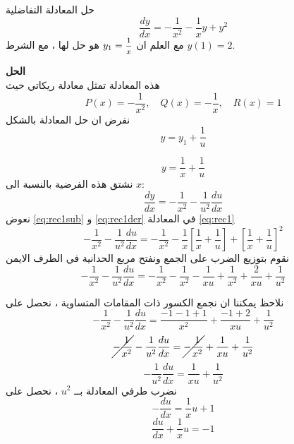 		\begin{frame}
			\setcounter{equation}{0}
			\begin{example}
				حل المعادلة التفاضلية
				\begin{equation}
					\label{eq:rec1}
					\frac{dy}{dx} = -\frac{1}{x^2} - \frac{1}{x} y + y^2
				\end{equation}
				مع العلم ان 
				$y_1=\mfrac{1}{x}$ هو حل لها ، مع الشرط $y(1) = 2 $.
			\end{example}
			\textbf{الحل}\\
				هذه المعادلة تمثل معادلة ريكاتي حيث
				\[
				P(x) = -\frac{1}{x^2}, \quad Q(x) =-\frac{1}{x} , \quad R(x) = 1 
				\]
				نفرض ان حل المعادلة بالشكل
				\[
				y = y_1 + \frac{1}{u}
				\]
			\end{frame}
			
			\begin{frame}
				
				\begin{equation}
					\label{eq:rec1sub}
					y = \frac{1}{x} + \frac{1}{u}
				\end{equation}
				نشتق هذه الفرضية بالنسبة الى $x$:
				\begin{equation}
					\label{eq:rec1der}
					\frac{dy}{dx} = -\frac{1}{x^2} - \frac{1}{u^2}\frac{du}{dx}
				\end{equation}
				نعوض 
				\eqref{eq:rec1sub} و \eqref{eq:rec1der} في المعادلة \eqref{eq:rec1}
				\[
				-\frac{1}{x^2} - \frac{1}{u^2}\frac{du}{dx} = -\frac{1}{x^2} - \frac{1}{x} \left[\frac{1}{x} + \frac{1}{u}\right] + \left[\frac{1}{x} + \frac{1}{u}\right]^2
				\]
				نقوم بتوزيع الضرب على الجمع ونفتح مربع الحدانية في الطرف الايمن
				\[
				-\frac{1}{x^2} - \frac{1}{u^2}\frac{du}{dx}=
				-\frac{1}{x^2}-\frac{1}{x^2} -\frac{1}{xu} + \frac{1}{x^2} + \frac{2}{xu} + \frac{1}{u^2}
				\]
			\end{frame}
			
			\begin{frame}
				
				نلاحظ يمكننا ان نجمع الكسور ذات المقامات المتساوية ، نحصل على 
				\[
				-\frac{1}{x^2} - \frac{1}{u^2}\frac{du}{dx}=
				\frac{-1-1+1}{x^2} + \frac{-1+2}{xu} + \frac{1}{u^2} 
				\]
				\[
				\cancel{-\frac{1}{x^2}} - \frac{1}{u^2}\frac{du}{dx}=
				\cancel{-\frac{1}{x^2}} + \frac{1}{xu} + \frac{1}{u^2}
				\]
				\[
				-\frac{1}{u^2}\frac{du}{dx} = \frac{1}{xu} + \frac{1}{u^2}
				\]
				نضرب طرفي المعادلة بــ  $u^2 $ ، نحصل على 
				\[
				-\frac{du}{dx} = \frac{1}{x} u + 1
				\]
				\begin{equation}
					\label{eq:rec1linear}
					\frac{du}{dx} + \frac{1}{x} u = -1
				\end{equation}
			\end{frame}
			
